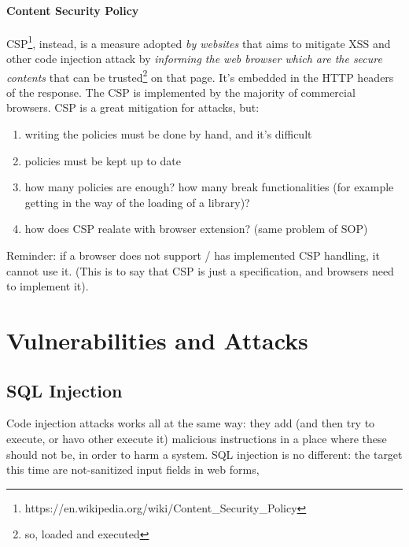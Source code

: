 \documentclass{article}
\begin{document}
				\paragraph{Content Security Policy}
					CSP\footnote{https://en.wikipedia.org/wiki/Content\_Security\_Policy}, instead, is a measure adopted \emph{by websites} that aims to mitigate XSS and other code injection attack by \emph{informing the web browser which are the secure contents} that can be trusted\footnote{so, loaded and executed} on that page. It's embedded in the HTTP headers of the response. The CSP is implemented by the majority of commercial browsers. CSP is a great mitigation for attacks, but:
					\begin{enumerate}
						\item writing the policies must be done by hand, and it's difficult
						\item policies must be kept up to date
						\item how many policies are enough? how many break functionalities (for example getting in the way of the loading of a library)?
						\item how does CSP realate with browser extension? (same problem of SOP)
					\end{enumerate}
					Reminder: if a browser does not support / has implemented CSP handling, it cannot use it. (This is to say that CSP is just a specification, and browsers need to implement it).

		\section{Vulnerabilities and Attacks}
			\subsection{SQL Injection}
				Code injection attacks works all at the same way: they add (and then try to execute, or havo other execute it) malicious instructions in a place where these should not be, in order to harm a system. SQL injection is no different: the target this time are not-sanitized input fields in web forms,
				
\end{document}
